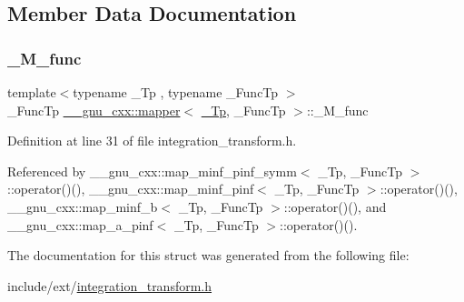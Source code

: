\subsection{Member Data Documentation}
\mbox{\label{struct____gnu__cxx_1_1mapper_a577a510fcb97643f3681a251a3a7acca}} 
\subsubsection{\texorpdfstring{\+\_\+\+M\+\_\+func}{\_M\_func}}
{\footnotesize\ttfamily template$<$typename \+\_\+\+Tp , typename \+\_\+\+Func\+Tp $>$ \\
\+\_\+\+Func\+Tp \hyperlink{struct____gnu__cxx_1_1mapper}{\+\_\+\+\_\+gnu\+\_\+cxx\+::mapper}$<$ \hyperlink{namespace____gnu__cxx_a3b19a9c800ca194374ef9172290f7d79}{\+\_\+\+Tp}, \+\_\+\+Func\+Tp $>$\+::\+\_\+\+M\+\_\+func}



Definition at line 31 of file integration\+\_\+transform.\+h.



Referenced by \+\_\+\+\_\+gnu\+\_\+cxx\+::map\+\_\+minf\+\_\+pinf\+\_\+symm$<$ \+\_\+\+Tp, \+\_\+\+Func\+Tp $>$\+::operator()(), \+\_\+\+\_\+gnu\+\_\+cxx\+::map\+\_\+minf\+\_\+pinf$<$ \+\_\+\+Tp, \+\_\+\+Func\+Tp $>$\+::operator()(), \+\_\+\+\_\+gnu\+\_\+cxx\+::map\+\_\+minf\+\_\+b$<$ \+\_\+\+Tp, \+\_\+\+Func\+Tp $>$\+::operator()(), and \+\_\+\+\_\+gnu\+\_\+cxx\+::map\+\_\+a\+\_\+pinf$<$ \+\_\+\+Tp, \+\_\+\+Func\+Tp $>$\+::operator()().



The documentation for this struct was generated from the following file\+:\begin{DoxyCompactItemize}
\item 
include/ext/\hyperlink{integration__transform_8h}{integration\+\_\+transform.\+h}\end{DoxyCompactItemize}
